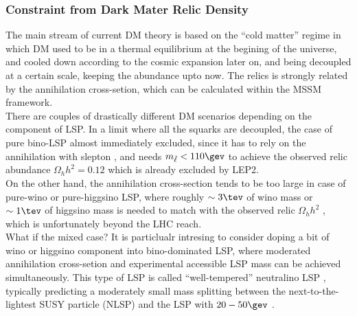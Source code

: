 \subsubsection{Constraint from Dark Mater Relic Density} \label{sec::Introduction::DMconstraint}
The main stream of current DM theory is based on the ``cold matter'' regime in which DM used to be in a thermal equilibrium at the begining of the universe, and cooled down according to the cosmic expansion later on, and being decoupled at a certain scale, keeping the abundance upto now. The relics is strongly related by the annihilation cross-setion, which can be calculated within the MSSM framework. \\

There are couples of drastically different DM scenarios depending on the component of LSP.
In a limit where all the squarks are decoupled, the case of pure bino-LSP almost immediately excluded, since it has to rely on the annihilation with slepton \cite{SUSYDM_WTN}, 
and needs $m_{\tlep}<110\gev$ to achieve the observed relic abundance $\Omega_h h^2= 0.12$ which is already excluded by LEP2. \\

On the other hand, 
the annihilation cross-section tends to be too large in case of pure-wino or pure-higgsino LSP, where roughly $\sim 3\tev$ of wino mass or $\sim 1\tev$ of higgsino mass is needed to match with the observed relic $\Omega_h h^2$ \cite{SUSYDM_WTN}, which is unfortunately beyond the LHC reach. \\

What if the mixed case? It is particlualr intresing to consider doping a bit of wino or higgsino component into bino-dominated LSP, where moderated annihilation cross-setion and experimental accessible LSP mass can be achieved simultaneously. This type of LSP is called ``well-tempered'' neutralino LSP \cite{SUSYDM_WTN}, typically predicting a moderately small mass splitting between the next-to-the-lightest SUSY particle (NLSP) and the LSP with $20-50\gev$ \cite{SUSYDM_BWCA} \cite{Bramante2016}. \\

